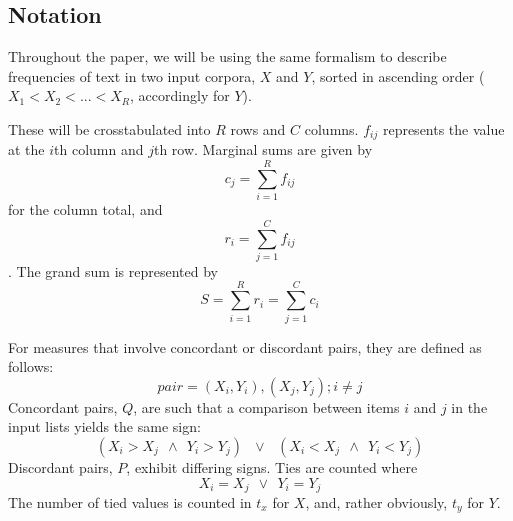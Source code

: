 \documentclass[11pt]{article}
\begin{document}
\subsection{Notation}
Throughout the paper, we will be using the same formalism to describe frequencies of text in two input corpora, $X$ and $Y$, sorted in ascending order ($X_1 < X_2 < ... < X_R$, accordingly for $Y$).

These will be crosstabulated into $R$ rows and $C$ columns.  $f_{ij}$ represents the value at the $i$th column and $j$th row.  Marginal sums are given by 
$$ c_j = \sum_{i=1}^{R}f_{ij} $$ for the column total, and $$ r_i = \sum_{j=1}^{C}f_{ij} $$.  The grand sum is represented by $$S = \sum_{i=1}^{R}r_i = \sum_{j=1}^{C}c_i $$

For measures that involve concordant or discordant pairs, they are defined as follows:
$$
pair = (X_i, Y_i), (X_j, Y_j); i \neq j
$$
Concordant pairs, $Q$, are such that a comparison between items $i$ and $j$ in the input lists yields the same sign:
$$
(X_i > X_j ~~\wedge~~ Y_i > Y_j)
~~~ \vee ~~~
(X_i < X_j ~~\wedge~~ Y_i < Y_j)
$$
Discordant pairs, $P$, exhibit differing signs.  Ties are counted where
$$
X_i = X_j ~~\vee~~ Y_i = Y_j
$$
The number of tied values is counted in $t_x$ for $X$, and, rather obviously, $t_y$ for $Y$.



\end{document}
